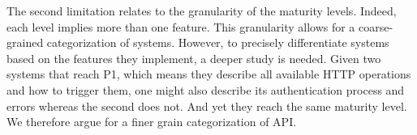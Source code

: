 The second limitation relates to the granularity of the maturity levels. Indeed, each level implies more than one feature. This granularity allows for a coarse-grained categorization of systems. 
However, to precisely differentiate systems based on the features they implement, a deeper study is needed. 
Given two systems that reach P1, which means they describe all available HTTP operations and how to trigger them, one might also describe its authentication process and errors whereas the second does not. 
And yet they reach the same maturity level. 
We therefore argue for a finer grain categorization of API.